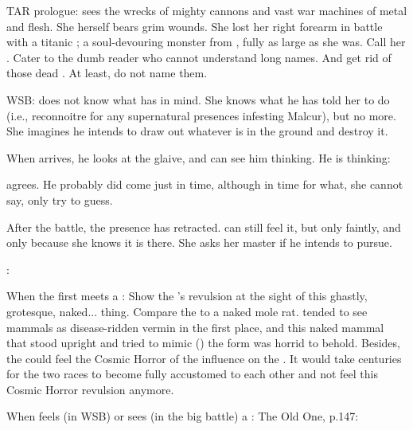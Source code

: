 TAR prologue:
  \Nzessuacrith sees the wrecks of mighty cannons and vast war machines of metal and flesh. 
  She herself bears grim wounds. 
  She lost her right forearm in battle with a titanic \umbra; a soul-devouring monster from \Erebos, fully as large as she was.
  Call her .
  Cater to the dumb reader who cannot understand long names. 
  And get rid of those dead \dragons. At least, do not name them.  


WSB: 
    \Criseis does not know what \Ishnaruchaefir has in mind. 
    She knows what he has told her to do (i.e., reconnoitre for any supernatural presences infesting Malcur), but no more.
    She imagines he intends to draw out whatever is in the ground and destroy it.
    
    When \Teshrial arrives, he looks at the glaive, and \Criseis can see him thinking. 
    He is thinking: 
      
    \Criseis agrees. He probably did come just in time, although in time for what, she cannot say, only try to guess. 
    
    After the battle, the \noggyal presence has retracted. 
    \Criseis can still feel it, but only faintly, and only because she knows it is there.
    She asks her master if he intends to pursue.
    
    \Ishnaruchaefir:


When the first \scatha meets a \human: 
Show the \scatha's revulsion at the sight of this ghastly, grotesque, naked... thing. 
Compare the \human to a naked mole rat. 
\Scathae tended to see mammals as disease-ridden vermin in the first place, and this naked mammal that stood upright and tried to mimic () the \scathaese form was horrid to behold. 
Besides, the \scatha could feel the Cosmic Horror of the \pps{\banes} influence on the \human. 
It would take centuries for the two races to become fully accustomed to each other and not feel this Cosmic Horror revulsion anymore. 


When \Criseis feels (in WSB) or sees (in the big battle) a \noggyal:
The Old One, p.147:


